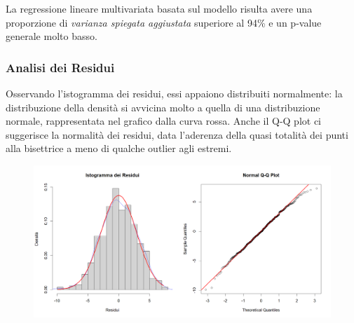 \documentclass[11pt,a4paper]{article}
\begin{document}
La regressione lineare multivariata basata sul modello risulta avere una proporzione di \emph{varianza spiegata aggiustata} superiore al 94\% e un p-value generale molto basso.

\subsubsection{Analisi dei Residui}
Osservando l'istogramma dei residui, essi appaiono distribuiti normalmente: la distribuzione della densità si avvicina molto a quella di una distribuzione normale, rappresentata nel grafico dalla curva rossa. 
Anche il Q-Q plot ci suggerisce la normalità dei residui, data l'aderenza della quasi totalità dei punti alla bisettrice a meno di qualche outlier agli estremi.  

\begin{figure}[h]
    \hspace{-1.5cm}
	\includegraphics[scale=0.55]{imgs/residuals_analysis_linear_model.png}
    \end{figure}
\vspace{-0.4cm}
\end{document}
